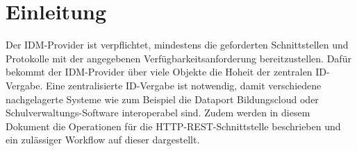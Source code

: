 \chapter{Einleitung}
Der IDM-Provider ist verpflichtet, mindestens die geforderten Schnittstellen und Protokolle mit der angegebenen Verfügbarkeitsanforderung bereitzustellen.
Dafür bekommt der IDM-Provider über viele Objekte die Hoheit der zentralen ID-Vergabe.
Eine zentralisierte ID-Vergabe ist notwendig, damit verschiedene nachgelagerte Systeme wie zum Beispiel die Dataport Bildungscloud oder Schulverwaltungs-Software interoperabel sind.
Zudem werden in diesem Dokument die Operationen für die HTTP-REST-Schnittstelle beschrieben und ein zulässiger Workflow auf dieser dargestellt.

